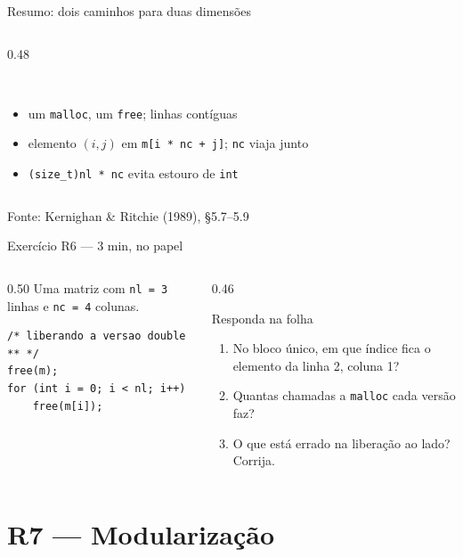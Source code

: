 \documentclass[aspectratio=169]{beamer}
\newcommand{\fonte}[1]{\vfill\hfill{\scriptsize\textcolor{UFSGray}{Fonte: #1}}}
\begin{document}
\begin{frame}{Resumo: dois caminhos para duas dimensões}
\begin{columns}[T]
\begin{column}{0.48\textwidth}
\\[0.8em]
      \begin{itemize}\scriptsize
        \item um \texttt{malloc}, um \texttt{free}; linhas contíguas
        \item elemento $(i,j)$ em \texttt{m[i * nc + j]}; \texttt{nc} viaja junto
        \item \texttt{(size\_t)nl * nc} evita estouro de \texttt{int}
      \end{itemize}
    \end{column}
  \end{columns}
  \fonte{Kernighan \& Ritchie (1989), §5.7--5.9~\cite{kernighan1989c}}
\end{frame}

\begin{frame}[fragile]{Exercício R6 --- 3 min, no papel}
  \begin{columns}[T]
    \begin{column}{0.50\textwidth}
      \small Uma matriz com \texttt{nl = 3} linhas e \texttt{nc = 4} colunas.
\begin{lstlisting}[style=numC]
/* liberando a versao double ** */
free(m);
for (int i = 0; i < nl; i++)
    free(m[i]);
\end{lstlisting}
    \end{column}
    \begin{column}{0.46\textwidth}
      \begin{block}{Responda na folha}
        \begin{enumerate}
          \item[(a)] No bloco único, em que índice fica o elemento da linha
            2, coluna 1?
          \item[(b)] Quantas chamadas a \texttt{malloc} cada versão faz?
          \item[(c)] O que está errado na liberação ao lado? Corrija.
        \end{enumerate}
      \end{block}
    \end{column}
  \end{columns}
\end{frame}

\section{R7 --- Modularização}
\end{document}

